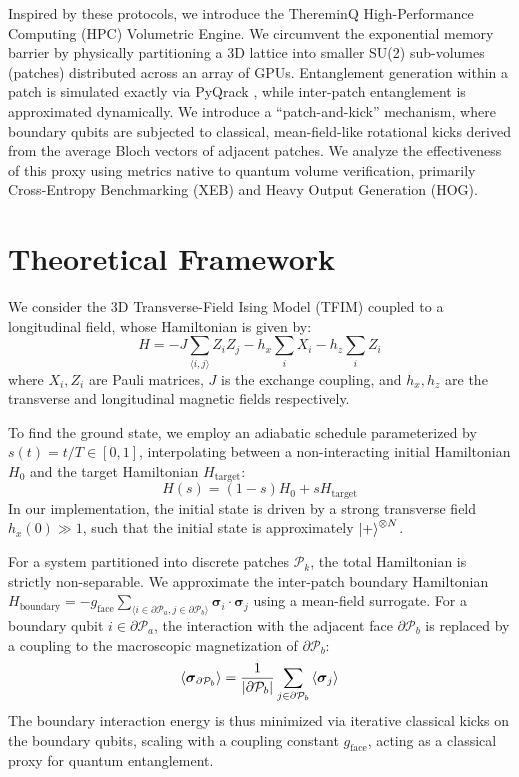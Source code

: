 \documentclass[11pt,a4paper]{article}
\begin{document}
Inspired by these protocols, we introduce the ThereminQ High-Performance Computing (HPC) Volumetric Engine. We circumvent the exponential memory barrier by physically partitioning a 3D lattice into smaller SU(2) sub-volumes (patches) distributed across an array of GPUs. Entanglement generation within a patch is simulated exactly via PyQrack \cite{pyqrack}, while inter-patch entanglement is approximated dynamically. We introduce a ``patch-and-kick'' mechanism, where boundary qubits are subjected to classical, mean-field-like rotational kicks derived from the average Bloch vectors of adjacent patches. We analyze the effectiveness of this proxy using metrics native to quantum volume verification, primarily Cross-Entropy Benchmarking (XEB) \cite{arute2019quantum} and Heavy Output Generation (HOG).

\section{Theoretical Framework}

We consider the 3D Transverse-Field Ising Model (TFIM) coupled to a longitudinal field, whose Hamiltonian is given by:
\begin{equation}
    H = -J \sum_{\langle i, j \rangle} Z_i Z_j - h_x \sum_{i} X_i - h_z \sum_{i} Z_i
\end{equation}
where $X_i, Z_i$ are Pauli matrices, $J$ is the exchange coupling, and $h_x, h_z$ are the transverse and longitudinal magnetic fields respectively.

To find the ground state, we employ an adiabatic schedule parameterized by $s(t) = t/T \in [0,1]$, interpolating between a non-interacting initial Hamiltonian $H_0$ and the target Hamiltonian $H_{\text{target}}$:
\begin{equation}
    H(s) = (1-s) H_0 + s H_{\text{target}}
\end{equation}
In our implementation, the initial state is driven by a strong transverse field $h_x(0) \gg 1$, such that the initial state is approximately $\ket{+}^{\otimes N}$.

For a system partitioned into discrete patches $\mathcal{P}_k$, the total Hamiltonian is strictly non-separable. We approximate the inter-patch boundary Hamiltonian $H_{\text{boundary}} = -g_{\text{face}} \sum_{\langle i \in \partial \mathcal{P}_a, j \in \partial \mathcal{P}_b \rangle} \boldsymbol{\sigma}_i \cdot \boldsymbol{\sigma}_j$ using a mean-field surrogate. For a boundary qubit $i \in \partial \mathcal{P}_a$, the interaction with the adjacent face $\partial \mathcal{P}_b$ is replaced by a coupling to the macroscopic magnetization of $\partial \mathcal{P}_b$:
\begin{equation}
    \ev{\boldsymbol{\sigma}_{\partial \mathcal{P}_b}} = \frac{1}{|\partial \mathcal{P}_b|} \sum_{j \in \partial \mathcal{P}_b} \ev{\boldsymbol{\sigma}_j}
\end{equation}
The boundary interaction energy is thus minimized via iterative classical kicks on the boundary qubits, scaling with a coupling constant $g_{\text{face}}$, acting as a classical proxy for quantum entanglement.
\end{document}

